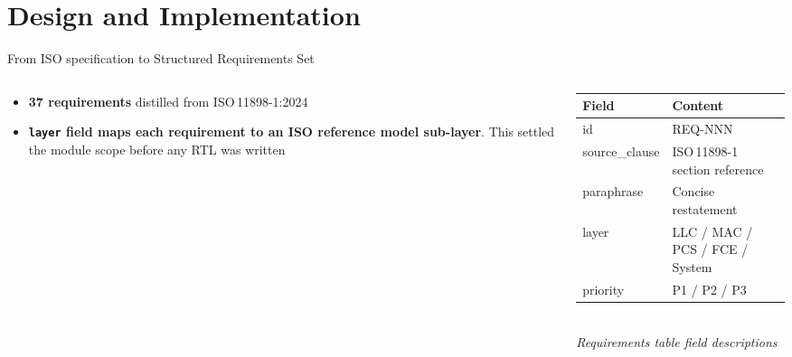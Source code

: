 \documentclass[aspectratio=169,hyperref={pdfpagelabels=false}]{beamer}
\begin{document}
\section{Design and Implementation}
\begin{frame}{From ISO specification to Structured Requirements Set}
	\begin{columns}[c]
		\begin{column}{0.40\textwidth}
			\begin{itemize}\setlength{\itemsep}{8pt}
				\item \textbf{37 requirements} distilled from ISO\,11898-1:2024
				\item \textbf{\texttt{layer} field maps each requirement to an ISO reference model sub-layer}. This settled the module scope before any RTL was written
			\end{itemize}
		\end{column}
		\begin{column}{0.60\textwidth}
			\footnotesize
			\begin{tabular}{p{} p{}}
				\toprule
				\textbf{Field} & \textbf{Content}               \\
				\midrule
				id             & REQ-NNN                        \\
				source\_clause & ISO\,11898-1 section reference \\
				paraphrase     & Concise restatement            \\
				layer          & LLC / MAC / PCS / FCE / System \\
				priority       & P1 / P2 / P3                   \\
				\bottomrule
			\end{tabular}\\
			{\small\textit{Requirements table field descriptions}}
		\end{column}
	\end{columns}
\end{frame}
\end{document}
